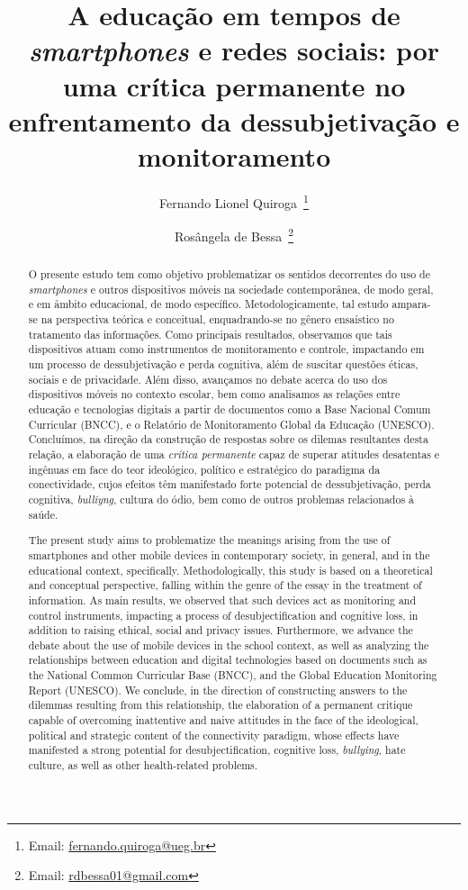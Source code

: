 \documentclass[portuguese]{textolivre}
\title{A educação em tempos de \textit{smartphones} e redes sociais: por uma crítica permanente no enfrentamento da dessubjetivação e monitoramento}
\author[1]{Fernando Lionel Quiroga~\orcid{0000-0003-4172-2002}\thanks{Email: \href{mailto:fernando.quiroga@ueg.br}{fernando.quiroga@ueg.br}}}
\author[2]{Rosângela de Bessa~\orcid{0009-0007-1967-5760}\thanks{Email: \href{mailto:rdbessa01@gmail.com}{rdbessa01@gmail.com}}}
\affil[1]{Centro de Ensino e Aprendizagem em Rede, Programa de Pós-Graduação em Educação, Linguagens e Tecnologias, Anápolis, GO, Brasil.}
\affil[2]{Universidade Estadual de Goiás, Anápolis, GO, Brasil.}
\begin{document}
\maketitle
\begin{polyabstract}
\begin{abstract}
O presente estudo tem como objetivo problematizar os sentidos decorrentes do uso de \textit{smartphones} e outros dispositivos móveis na sociedade contemporânea, de modo geral, e em âmbito educacional, de modo específico. Metodologicamente, tal estudo ampara-se na perspectiva teórica e conceitual, enquadrando-se no gênero ensaístico no tratamento das informações. Como principais resultados, observamos que tais dispositivos atuam como instrumentos de monitoramento e controle, impactando em um processo de dessubjetivação e perda cognitiva, além de suscitar questões éticas, sociais e de privacidade. Além disso, avançamos no debate acerca do uso dos dispositivos móveis no contexto escolar, bem como analisamos as relações entre educação e tecnologias digitais a partir de documentos como a Base Nacional Comum Curricular (BNCC), e o Relatório de Monitoramento Global da Educação (UNESCO). Concluímos, na direção da construção de respostas sobre os dilemas resultantes desta relação, a elaboração de uma \textit{crítica permanente} capaz de superar atitudes desatentas e ingênuas em face do teor ideológico, político e estratégico do paradigma da conectividade, cujos efeitos têm manifestado forte potencial de dessubjetivação, perda cognitiva, \textit{bulliyng}, cultura do ódio, bem como de outros problemas relacionados à saúde.

\end{abstract}

\begin{english}
\begin{abstract}
The present study aims to problematize the meanings arising from the use of smartphones and other mobile devices in contemporary society, in general, and in the educational context, specifically. Methodologically, this study is based on a theoretical and conceptual perspective, falling within the genre of the essay in the treatment of information. As main results, we observed that such devices act as monitoring and control instruments, impacting a process of desubjectification and cognitive loss, in addition to raising ethical, social and privacy issues. Furthermore, we advance the debate about the use of mobile devices in the school context, as well as analyzing the relationships between education and digital technologies based on documents such as the National Common Curricular Base (BNCC), and the Global Education Monitoring Report (UNESCO). We conclude, in the direction of constructing answers to the dilemmas resulting from this relationship, the elaboration of a permanent critique capable of overcoming inattentive and naive attitudes in the face of the ideological, political and strategic content of the connectivity paradigm, whose effects have manifested a strong potential for desubjectification, cognitive loss, \textit{bullying}, hate culture, as well as other health-related problems.


\end{abstract}
\end{english}
\end{polyabstract}
\end{document}
